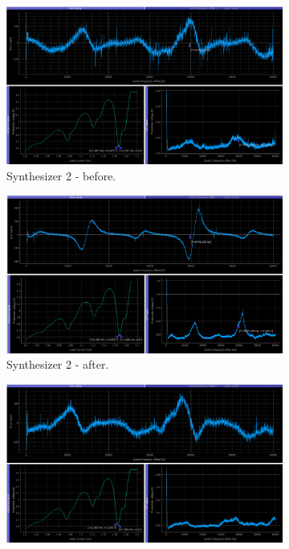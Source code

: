 \documentclass[a4paper,12pt]{article}
\begin{document}
\begin{figure}[!h]
\centering
\begin{subfigure}[b]{0.49\textwidth}
\centering
\includegraphics[width=\textwidth]{Images/synth_2_before.png}
\captionsetup{justification=centering}
\caption{Synthesizer 2 - before.}
\end{subfigure}
\hfill
\begin{subfigure}[b]{0.49\textwidth}
\centering
\includegraphics[width=\textwidth]{Images/synth_2_after.png}
\captionsetup{justification=centering}
\caption{Synthesizer 2 - after.}
\end{subfigure}
\newline
\centering
\begin{subfigure}[b]{0.49\textwidth}
\centering
\includegraphics[width=\textwidth]{Images/synth_3_before.png}

\end{subfigure}
\end{figure}
\end{document}
